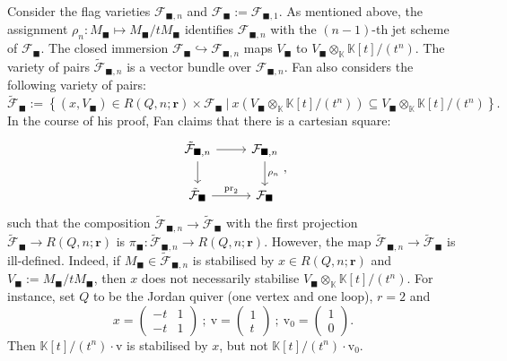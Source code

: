 \documentclass[11pt,english]{article}
\numberwithin{equation}{section}
\numberwithin{figure}{section}
\theoremstyle{definition}
\theoremstyle{plain}
\theoremstyle{remark}
\newcommand\rr{\mathbf{r}}
\newcommand\KK{\mathbb{K}}
\begin{document}
Consider the flag varieties $\mathcal{F}_{\blacksquare,n}$ and $\mathcal{F}_{\blacksquare}:=\mathcal{F}_{\blacksquare,1}$.
As mentioned above, the assignment $\rho_{n}:M_{\blacksquare}\mapsto M_{\blacksquare}/tM_{\blacksquare}$
identifies $\mathcal{F}_{\blacksquare,n}$ with the $(n-1)$-th jet
scheme of $\mathcal{F}_{\blacksquare}$. The closed immersion $\mathcal{F}_{\blacksquare}\hookrightarrow\mathcal{F}_{\blacksquare,n}$
maps $V_{\blacksquare}$ to $V_{\blacksquare}\otimes_{\KK}\KK[t]/(t^{n})$.
The variety of pairs $\tilde{\mathcal{F}}_{\blacksquare,n}$ is a
vector bundle over $\mathcal{F}_{\blacksquare,n}$. Fan also considers
the following variety of pairs:\[
\tilde{\mathcal{F}}_{\blacksquare}:=\left\{(x,V_{\blacksquare})\in R(Q,n;\rr)\times \mathcal{F}_{\blacksquare}\ \vert\ x(V_{\blacksquare}\otimes_{\KK}\KK[t]/(t^{n}))\subseteq V_{\blacksquare}\otimes_{\KK}\KK[t]/(t^{n}) \right\}.
\]In the course of his proof, Fan claims that there is a cartesian square:\[
\begin{tikzcd}[ampersand replacement=\&]
\tilde{\mathcal{F}}_{\blacksquare,n}\ar[r]\ar[d] \& \mathcal{F}_{\blacksquare,n} \ar[d, "\rho_n"] \\
\tilde{\mathcal{F}}_{\blacksquare} \ar[r,"\mathrm{pr}_2"] \& \mathcal{F}_{\blacksquare}
\end{tikzcd}
,
\]such that the composition $\tilde{\mathcal{F}}_{\blacksquare,n}\rightarrow\tilde{\mathcal{F}}_{\blacksquare}$
with the first projection $\tilde{\mathcal{F}}_{\blacksquare}\rightarrow R(Q,n;\rr)$
is $\pi_{\blacksquare}:\tilde{\mathcal{F}}_{\blacksquare,n}\rightarrow R(Q,n;\rr)$.
However, the map $\tilde{\mathcal{F}}_{\blacksquare,n}\rightarrow\tilde{\mathcal{F}}_{\blacksquare}$
is ill-defined. Indeed, if $M_{\blacksquare}\in\tilde{\mathcal{F}}_{\blacksquare,n}$
is stabilised by $x\in R(Q,n;\rr)$ and $V_{\blacksquare}:=M_{\blacksquare}/tM_{\blacksquare}$,
then $x$ does not necessarily stabilise $V_{\blacksquare}\otimes_{\KK}\KK[t]/(t^{n})$.
For instance, set $Q$ to be the Jordan quiver (one vertex and one
loop), $r=2$ and\[
x=
\left(
\begin{array}{cc}
-t & 1 \\
-t & 1
\end{array}
\right)
\ ;\ 
\mathrm{v}=
\left(
\begin{array}{c}
1 \\
t
\end{array}
\right)
\ ;\ 
\mathrm{v}_0=
\left(
\begin{array}{c}
1 \\
0
\end{array}
\right)
.
\]Then $\KK[t]/(t^{n})\cdot\mathrm{v}$ is stabilised by $x$, but not
$\KK[t]/(t^{n})\cdot\mathrm{v}_{0}.$
\end{document}
